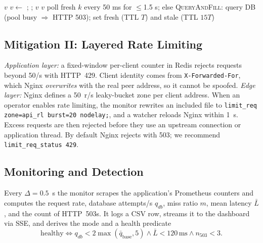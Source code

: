 \documentclass[journal]{IEEEtran}
\begin{document}
\begin{algorithm}[t]
\caption{Read path with single-flight locking and SWR}
\label{alg:read}
\small
\begin{algorithmic}[1]
 \Return $v$ \EndIf
{} \Return {} \EndIf
{} 
  \State $v\gets$ ; ; \Return $v$
\EndIf
{} \Return $v$ \EndIf
\State poll fresh $k$ every 50 ms for $\le$1.5 s; else \Return {}
\Statex \textsc{QueryAndFill}: query DB (pool busy $\Rightarrow$ HTTP 503);
set fresh (TTL $T$) and stale (TTL $15T$)
\end{algorithmic}
\end{algorithm}

\subsection{Mitigation II: Layered Rate Limiting}
\emph{Application layer:} a fixed-window per-client counter in Redis rejects requests
beyond 50/s with HTTP~429. Client identity comes from \texttt{X-Forwarded-For}, which
Nginx \emph{overwrites} with the real peer address, so it cannot be spoofed.
\emph{Edge layer:} Nginx defines a 50~r/s leaky-bucket zone per client address. When an
operator enables rate limiting, the monitor rewrites an included file to
\texttt{limit\_req zone=api\_rl burst=20 nodelay;}, and a watcher reloads Nginx within
1~s. Excess requests are then rejected before they use an upstream connection or
application thread. By default Nginx rejects with 503; we recommend
\texttt{limit\_req\_status 429}.

\subsection{Monitoring and Detection}
Every $\Delta=0.5$~s the monitor scrapes the application's Prometheus counters
 and computes the request rate, database attempts/s $q_{db}$, miss
ratio $m$, mean latency $\bar L$, and the count of HTTP~503s. It logs a CSV row, streams
it to the dashboard via SSE, and derives the mode and a health predicate
\begin{equation}
\mathrm{healthy} \iff q_{db}<2\max(\bar q_{\mathrm{base}},5) \wedge \bar L<120\,\mathrm{ms} \wedge n_{503}<3 .
\label{eq:healthy}
\end{equation}
\end{document}
